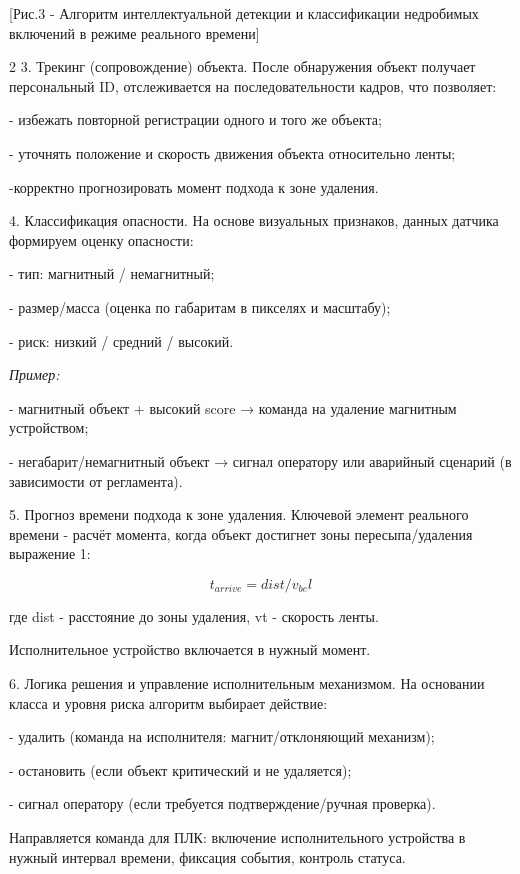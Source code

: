 [Рис.3 - Алгоритм интеллектуальной детекции и классификации
недробимых включений в режиме реального времени]

\begin{multicols}{2}
3. Трекинг (сопровождение) объекта. После обнаружения объект получает
персональный ID, отслеживается на последовательности кадров, что
позволяет:

- избежать повторной регистрации одного и того же объекта;

- уточнять положение и скорость движения объекта относительно ленты;

-корректно прогнозировать момент подхода к зоне удаления.

4. Классификация опасности. На основе визуальных признаков, данных
датчика формируем оценку опасности:

- тип: магнитный / немагнитный;

- размер/масса (оценка по габаритам в пикселях и масштабу);

- риск: низкий / средний / высокий.

\emph{Пример:}

- магнитный объект + высокий score → команда на удаление
магнитным устройством;

- негабарит/немагнитный объект → сигнал оператору или аварийный
сценарий (в зависимости от регламента).

5. Прогноз времени подхода к зоне удаления. Ключевой элемент реального
времени - расчёт момента, когда объект достигнет зоны пересыпа/удаления
выражение 1:

\begin{equation}
t_{arrive}=dist/v_{be}l
\end{equation}

где dist - расстояние до зоны удаления, vt - скорость
ленты.

Исполнительное устройство включается в нужный момент.

6. Логика решения и управление исполнительным механизмом. На основании
класса и уровня риска алгоритм выбирает действие:

- удалить (команда на исполнителя: магнит/отклоняющий
механизм);

- остановить (если объект критический и не удаляется);

- сигнал оператору (если требуется подтверждение/ручная
проверка).

Направляется команда для ПЛК: включение исполнительного устройства в
нужный интервал времени, фиксация события, контроль статуса.


\end{multicols}
